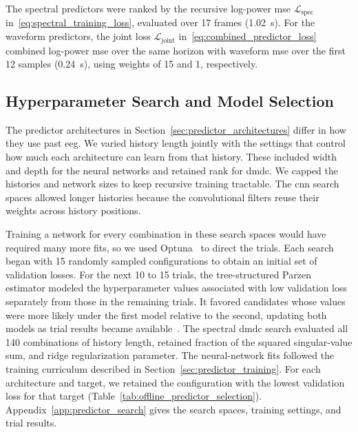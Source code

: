 The spectral predictors were ranked by the recursive log-power \ac{mse} $\mathcal{L}_\mathrm{spec}$ in~\eqref{eq:spectral_training_loss}, evaluated over 17 frames (\SI{1.02}{\second}).
For the waveform predictors, the joint loss $\mathcal{L}_\mathrm{joint}$ in~\eqref{eq:combined_predictor_loss} combined log-power \ac{mse} over the same horizon with waveform \ac{mse} over the first 12 samples (\SI{0.24}{\second}), using weights of 15 and 1, respectively.

\subsection{Hyperparameter Search and Model Selection}

The predictor architectures in Section~\ref{sec:predictor_architectures} differ in how they use past \ac{eeg}.
We varied history length jointly with the settings that control how much each architecture can learn from that history.
These included width and depth for the neural networks and retained rank for \ac{dmdc}.
We capped the histories and network sizes to keep recursive training tractable.
The \ac{cnn} search spaces allowed longer histories because the convolutional filters reuse their weights across history positions.

Training a network for every combination in these search spaces would have required many more fits, so we used Optuna~\cite{Akiba2019} to direct the trials.
Each search began with 15 randomly sampled configurations to obtain an initial set of validation losses.
For the next 10 to 15 trials, the tree-structured Parzen estimator modeled the hyperparameter values associated with low validation loss separately from those in the remaining trials.
It favored candidates whose values were more likely under the first model relative to the second, updating both models as trial results became available~\cite{Bergstra2011}.
The spectral \ac{dmdc} search evaluated all 140 combinations of history length, retained fraction of the squared singular-value sum, and ridge regularization parameter.
The neural-network fits followed the training curriculum described in Section~\ref{sec:predictor_training}.
For each architecture and target, we retained the configuration with the lowest validation loss for that target (Table~\ref{tab:offline_predictor_selection}).
Appendix~\ref{app:predictor_search} gives the search spaces, training settings, and trial results.

